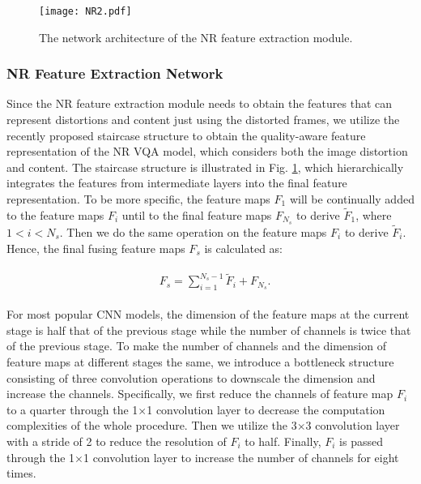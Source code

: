\documentclass{article}
\begin{document}
\begin{figure}[!t]
	\centering
	\texttt{[image: NR2.pdf]}
	\caption{The network architecture of the NR feature extraction module.}
	\label{NR}
	\vspace{-0.3cm}
\end{figure}

\subsubsection{NR Feature Extraction Network}
Since the NR feature extraction module needs to obtain the features that can represent distortions and content just using the distorted frames, we utilize the recently proposed staircase structure \cite{sun2021blind} to obtain the quality-aware feature representation of the NR VQA model, which considers both the image distortion and content. The staircase structure is illustrated in Fig. \ref{NR}, which hierarchically integrates the features from intermediate layers into the final feature representation. To be more specific, the feature maps $F_{1}$ will be continually added to the feature maps $F_{i}$ until to the final feature maps $F_{N_s}$ to derive $\widetilde{F}_{1}$, where $1 < i < N_s$. Then we do the same operation on the feature maps $F_i$ to derive $\widetilde{F}_{i}$. Hence, the final fusing feature maps $F_{s}$ is calculated as:

\begin{eqnarray}
\begin{aligned}
\label{feature_fuse3}
& F_s = \sum^{N_{s}-1}_{i=1} \widetilde F_i + F_{N_{s}} .
\end{aligned}
\end{eqnarray}

For most popular CNN models, the dimension of the feature maps at the current stage is half that of the previous stage while the number of channels is twice that of the previous stage. To make the number of channels and the dimension of feature maps at different stages the same, we introduce a bottleneck structure consisting of three convolution operations to downscale the dimension and increase the channels. Specifically, we first reduce the channels of feature map $F_i$ to a quarter through the 1$\times$1 convolution layer to decrease the computation complexities of the whole procedure. Then we utilize the 3$\times$3 convolution layer with a stride of 2 to reduce the resolution of $F_i$ to half. Finally, $F_i$ is passed through the 1$\times$1 convolution layer to increase the number of channels for eight times.
\end{document}
